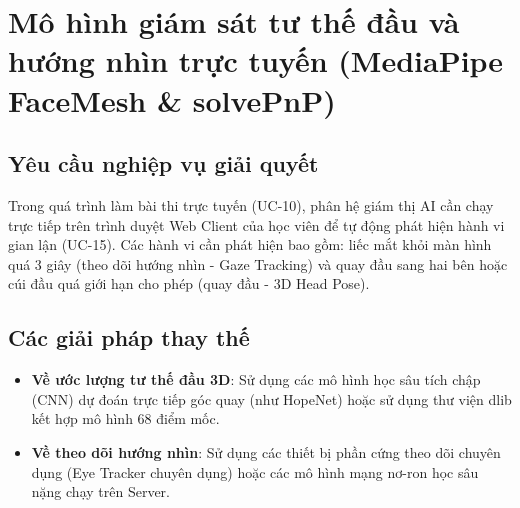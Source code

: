 \documentclass[../DoAn.tex]{subfiles}
\begin{document}
\section{Mô hình giám sát tư thế đầu và hướng nhìn trực tuyến (MediaPipe FaceMesh \& solvePnP)}
\label{section:3.5}

\subsection{Yêu cầu nghiệp vụ giải quyết}
Trong quá trình làm bài thi trực tuyến (UC-10), phân hệ giám thị AI cần chạy trực tiếp trên trình duyệt Web Client của học viên để tự động phát hiện hành vi gian lận (UC-15). Các hành vi cần phát hiện bao gồm: liếc mắt khỏi màn hình quá 3 giây (theo dõi hướng nhìn - Gaze Tracking) và quay đầu sang hai bên hoặc cúi đầu quá giới hạn cho phép (quay đầu - 3D Head Pose).

\subsection{Các giải pháp thay thế}
\begin{itemize}
    \item \textbf{Về ước lượng tư thế đầu 3D}: Sử dụng các mô hình học sâu tích chập (CNN) dự đoán trực tiếp góc quay (như HopeNet) hoặc sử dụng thư viện dlib kết hợp mô hình 68 điểm mốc.
    \item \textbf{Về theo dõi hướng nhìn}: Sử dụng các thiết bị phần cứng theo dõi chuyên dụng (Eye Tracker chuyên dụng) hoặc các mô hình mạng nơ-ron học sâu nặng chạy trên Server.
\end{itemize}
\end{document}
